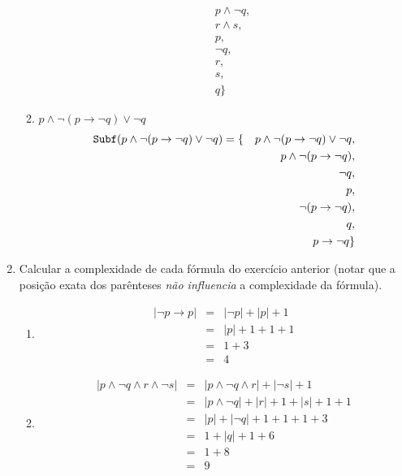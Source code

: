 \documentclass[12pt,a4paper,oneside]{article}
\begin{document}
\begin{enumerate}
\begin{enumerate}
{\begin{eqnarray*}
				  		& & p \wedge \neg q,\\
				  		& & r \wedge s,\\
				  		& & p,\\
				  		& & \neg q,\\
				  		& & r,\\
				  		& & s,\\
				  		& & q\}
				  	\end{eqnarray*}
				  }
			\item $p \wedge \neg (p \rightarrow \neg q) \vee \neg q$
			{\color{verde} \begin{eqnarray*} 
				  {\tt Subf}(p \wedge \neg (p \rightarrow \neg q) \vee \neg q) & = \{ & p \wedge \neg (p \rightarrow \neg q) \vee \neg q,\\
				  		& & p \wedge \neg (p \rightarrow \neg q),\\
				  		& & \neg q,\\
				  		& & p,\\
				  		& & \neg (p \rightarrow \neg q),\\
				  		& & q,\\
				  		& & p \rightarrow \neg q\}
				  	\end{eqnarray*}
				  }
		\end{enumerate}
		
	\item Calcular a complexidade de cada fórmula do exercício anterior (notar que a posição exata dos parênteses {\it não influencia} a complexidade da fórmula).
	\begin{enumerate}
			\item {\color{verde} \begin{eqnarray*}
										|\neg p \rightarrow p| & = & |\neg p| + |p| + 1\\
								      			& = & |p| + 1 + 1 + 1\\
								      			& = &  1 + 3 \\
								      			& = & 4
								 \end{eqnarray*}
				  }
			\item {\color{verde} \begin{eqnarray*}
										|p \wedge \neg q \wedge r \wedge \neg s| & = & |p \wedge \neg q \wedge r| +  |\neg s| + 1\\
								      			& = & |p \wedge \neg q| + |r| + 1 +  |s| + 1 + 1\\
								      			& = & |p| + |\neg q| + 1 + 1 + 1 + 3\\
								      			& = & 1 + |q| + 1 + 6\\
								      			& = & 1 + 8\\
								      			& = & 9
								 \end{eqnarray*}
				  }
				  

\end{enumerate}
\end{enumerate}
\end{document}
